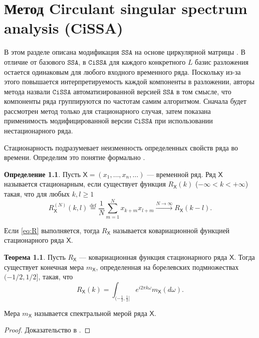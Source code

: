 \documentclass[12pt, specialist, subf
]{disser}
\theoremstyle{definition}
\newcommand{\SSA}{\texttt{SSA}}
\newcommand{\CISSA}{\texttt{CiSSA}}
\newcommand{\TS}{\mathsf{X}}
\newtheorem{definition}{Определение} %
\newtheorem{theorem}{Теорема} %
\begin{document}
\newpage






\chapter{Метод Circulant singular spectrum analysis (CiSSA)}
\label{sec:cissa}


В этом разделе описана модификация $\SSA$ на основе циркулярной матрицы \cite{bogalo2020}. В отличие от базового $\SSA$, в $\CISSA$ для каждого конкретного $L$ базис разложения остается одинаковым для любого входного временного ряда. Поскольку из-за этого повышается интерпретируемость каждой компоненты в разложении, авторы метода назвали $\CISSA$ автоматизированной версией $\SSA$  в том смысле, что компоненты ряда группируются по частотам самим алгоритмом. Сначала будет рассмотрен метод только для стационарного случая, затем показана применимость модифицированной версии $\CISSA$ при использовании нестационарного ряда.

Стационарность подразумевает неизменность определенных свойств ряда во времени. Определим это понятие формально \cite{golyandina2001analysis}.
\begin{definition}
	Пусть $\TS = (x_1, \dots, x_n, \dots)$ — временной ряд. Ряд $\TS$ называется стационарным, если существует функция $R_{\TS}(k)$ ($-\infty < k < +\infty$) такая, что для любых $k, l \geq 1$
	\begin{equation}
		R_{\TS}^{(N)}(k, l) \overset{\mathrm{def}}{=} \frac{1}{N} \sum_{m=1}^{N} x_{k+m} x_{l+m} \xrightarrow{N \to \infty} R_{\TS}(k - l). \label{eq:R}
	\end{equation}

	Если \eqref{eq:R} выполняется, тогда $R_{\TS}$ называется ковариационной функцией стационарного ряда $\TS$.
\end{definition}

\begin{theorem}
	Пусть $R_{\TS}$ — ковариационная функция стационарного ряда $\TS$. Тогда существует конечная мера $m_{\TS}$, определенная на борелевских подмножествах $(-1/2, 1/2]$, такая, что
	\[
		R_{\TS}(k) = \int_{(-\frac{1}{2}, \frac{1}{2}]} e^{i 2 \pi k \omega} m_{\TS}(d\omega).
	\]


	Мера $m_{\TS}$ называется спектральной мерой ряда $\TS$.
\end{theorem}
\begin{proof}
	Доказательство в \cite{golyandina2001analysis}.
\end{proof}
\end{document}
